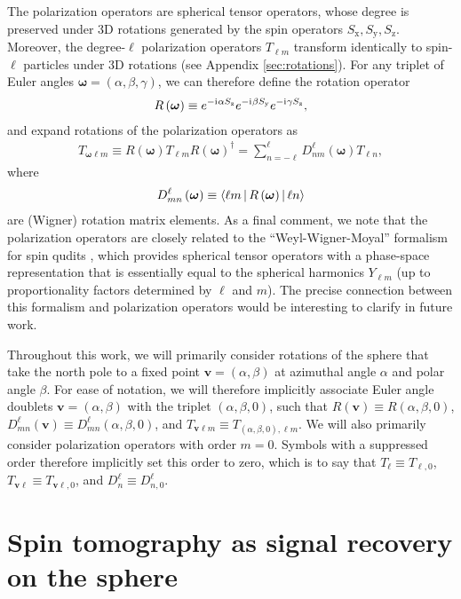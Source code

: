 \documentclass[notitlepage,twocolumn]{revtex4-2}
\newcommand{\p}[1]{\left(#1\right)} %
\newcommand{\bk}{\Braket} %
\renewcommand{\v}{\bm} %
\renewcommand{\i}{\mathrm{i}\mkern1mu} %
\newcommand{\x}{\text{x}}
\newcommand{\y}{\text{y}}
\newcommand{\z}{\text{z}}
\begin{document}
The polarization operators are spherical tensor operators, whose degree is preserved under 3D rotations generated by the spin operators $S_\x,S_\y,S_\z$.
Moreover, the degree-$\ell$ polarization operators $T_{\ell m}$ transform identically to spin-$\ell$ particles under 3D rotations (see Appendix \ref{sec:rotations}).
For any triplet of Euler angles $\v\omega=\p{\alpha,\beta,\gamma}$, we can therefore define the rotation operator
\begin{align}
  R\p{\v\omega} \equiv e^{-\i\alpha S_\z} e^{-\i\beta S_\y} e^{-\i\gamma S_\z},
\end{align}
and expand rotations of the polarization operators as
\begin{align}
  T_{\v\omega\ell m} \equiv
  R\p{\v\omega} T_{\ell m} R\p{\v\omega}^\dag
  = \sum_{n=-\ell}^\ell D_{nm}^\ell\p{\v\omega} T_{\ell n},
  \label{eq:trans_rot}
\end{align}
where
\begin{align}
  D_{mn}^\ell\p{\v\omega} \equiv \bk{\ell m|R\p{\v\omega}|\ell n}
\end{align}
are (Wigner) rotation matrix elements.
As a final comment, we note that the polarization operators are closely related to the ``Weyl-Wigner-Moyal'' formalism for spin qudits \cite{li2013weylwignermoyal}, which provides spherical tensor operators with a phase-space representation that is essentially equal to the spherical harmonics $Y_{\ell m}$ (up to proportionality factors determined by $\ell$ and $m$).
The precise connection between this formalism and polarization operators would be interesting to clarify in future work.

Throughout this work, we will primarily consider rotations of the sphere that take the north pole to a fixed point $\v v=\p{\alpha,\beta}$ at azimuthal angle $\alpha$ and polar angle $\beta$.
For ease of notation, we will therefore implicitly associate Euler angle doublets $\v v=\p{\alpha,\beta}$ with the triplet $\p{\alpha,\beta,0}$, such that $R\p{\v v} \equiv R\p{\alpha,\beta,0}$, $D^\ell_{mn}\p{\v v} \equiv D^\ell_{mn}\p{\alpha,\beta,0}$, and $T_{\v v\ell m} \equiv T_{\p{\alpha,\beta,0},\ell m}$.
We will also primarily consider polarization operators with order $m=0$.
Symbols with a suppressed order therefore implicitly set this order to zero, which is to say that $T_\ell\equiv T_{\ell,0}$, $T_{\v v\ell}\equiv T_{\v v\ell,0}$, and $D^\ell_n\equiv D^\ell_{n,0}$.

\section{Spin tomography as signal recovery on the sphere}
\label{sec:signal_recovery}
\end{document}
